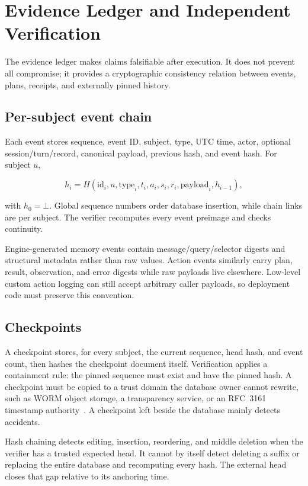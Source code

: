 \section{Evidence Ledger and Independent Verification}

The evidence ledger makes claims falsifiable after execution. It does not prevent all compromise; it provides a cryptographic consistency relation between events, plans, receipts, and externally pinned history.

\subsection{Per-subject event chain}

Each event stores sequence, event ID, subject, type, UTC time, actor, optional session/turn/record, canonical payload, previous hash, and event hash. For subject $u$,

\begin{equation}
h_i=H(\mathrm{id}_i,u,\mathrm{type}_i,t_i,a_i,s_i,r_i,\mathrm{payload}_i,h_{i-1}),
\label{eq:eventhash}
\end{equation}

with $h_0=\bot$. Global sequence numbers order database insertion, while chain links are per subject. The verifier recomputes every event preimage and checks continuity.

Engine-generated memory events contain message/query/selector digests and structural metadata rather than raw values. Action events similarly carry plan, result, observation, and error digests while raw payloads live elsewhere. Low-level custom action logging can still accept arbitrary caller payloads, so deployment code must preserve this convention.

\subsection{Checkpoints}

A checkpoint stores, for every subject, the current sequence, head hash, and event count, then hashes the checkpoint document itself. Verification applies a containment rule: the pinned sequence must exist and have the pinned hash. A checkpoint must be copied to a trust domain the database owner cannot rewrite, such as WORM object storage, a transparency service, or an RFC~3161 timestamp authority~\cite{adams2001timestamp}. A checkpoint left beside the database mainly detects accidents.

Hash chaining detects editing, insertion, reordering, and middle deletion when the verifier has a trusted expected head. It cannot by itself detect deleting a suffix or replacing the entire database and recomputing every hash. The external head closes that gap relative to its anchoring time.

